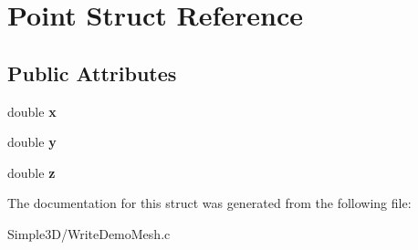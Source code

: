 \hypertarget{struct_point}{
\section{Point Struct Reference}
\label{struct_point}
}
\subsection*{Public Attributes}
\begin{DoxyCompactItemize}
\item 
\hypertarget{struct_point_ab99c56589bc8ad5fa5071387110a5bc7}{
double {\bfseries x}}
\label{struct_point_ab99c56589bc8ad5fa5071387110a5bc7}

\item 
\hypertarget{struct_point_afa38be143ae800e6ad69ce8ed4df62d8}{
double {\bfseries y}}
\label{struct_point_afa38be143ae800e6ad69ce8ed4df62d8}

\item 
\hypertarget{struct_point_a05ba3b1dfcb19430582ae953cbbfbded}{
double {\bfseries z}}
\label{struct_point_a05ba3b1dfcb19430582ae953cbbfbded}

\end{DoxyCompactItemize}


The documentation for this struct was generated from the following file:\begin{DoxyCompactItemize}
\item 
Simple3D/WriteDemoMesh.c\end{DoxyCompactItemize}
